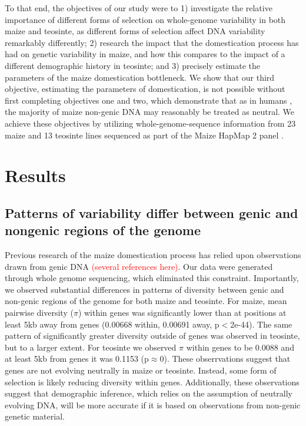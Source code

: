 \documentclass{pnastwo}
\begin{document}
\begin{article}
To that end, the objectives of our study were to 1) investigate the
relative importance of different forms of selection on whole-genome
variability in both maize and teosinte, as different forms of selection affect DNA
variability remarkably differently; 2) research the impact that the
domestication process has had on genetic variability in maize, and how
this compares to the impact of a different demographic history in
teosinte; and 3) precisely estimate the parameters of the
maize domestication bottleneck. We show that our third objective, estimating the
parameters of domestication, is not possible without first completing
 objectives one and two, which demonstrate that as in humans \cite{gazave2014}, the
majority of maize non-genic DNA may reasonably be treated as
neutral. We achieve these objectives by utilizing
whole-genome-sequence information from 23 maize and 13 teosinte lines
sequenced as part of the Maize HapMap 2 panel \cite{chia2012}.


\section{Results}
\subsection{Patterns of variability differ between genic and
  nongenic regions of the genome}
Previous research of the maize domestication process has relied upon
observations drawn from genic DNA \textcolor{red}{(several references
  here)}. Our data were generated through whole genome sequencing,
which eliminated this constraint. Importantly, we observed substantial
differences in patterns of diversity between genic and non-genic regions
of the genome for both maize and teosinte. For maize, mean pairwise
diversity ($\pi$) within genes was significantly lower than at
positions at least 5kb away from genes (0.00668 within, 0.00691 away, p$<$2e-44). The same
pattern of significantly greater diversity outside of genes was observed in
teosinte, but to a larger extent. For teosinte we observed $\pi$
within genes to be 0.0088 and at least 5kb from genes it was 0.1153
(p$\approx$0). These obserrvations suggest that genes are not evolving
neutrally in maize or teosinte. Instead, some form of selection is likely
reducing diversity within genes. Additionally, these observations
suggest that demographic inference, which relies on the assumption of
neutrally evolving DNA, will be more accurate if it is based on
observations from non-genic genetic material.


\end{article}
\end{document}
